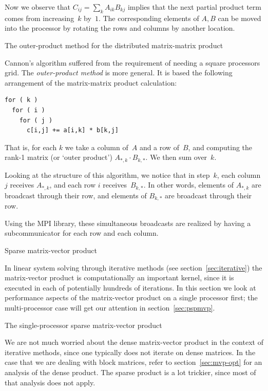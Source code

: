 Now we observe that $C_{ij}=\sum_kA_{ik}B_{kj}$ implies that
the next partial product term comes from increasing~$k$ by~$1$.
The corresponding elements of $A,B$ can be moved into the processor
by rotating the rows and columns by another location.

 {The outer-product method for the distributed matrix-matrix
  product}

Cannon's algorithm suffered from the requirement of needing a square
processors grid.
%
The \emph{outer-product method}%
is more general. It is based the following arrangement of the
matrix-matrix product calculation:
\begin{verbatim}
for ( k ) 
  for ( i )
    for ( j )
      c[i,j] += a[i,k] * b[k,j]
\end{verbatim}
That is, for each $k$ we take a column of~$A$ and a row of~$B$, and computing the
rank-1 matrix (or `outer product') $A_{*,k}\cdot B_{k,*}$. We then sum
over~$k$.

Looking at the structure of this algorithm, we notice that in
step~$k$, each column $j$ receives $A_{*,k}$, and each row $i$
receives~$B_{k,*}$. In other words, elements of $A_{*,k}$ are
broadcast through their row, and elements of $B_{k,*}$ are broadcast
through their row.

Using the MPI library, these simultaneous broadcasts are realized by
having a subcommunicator for each row and each column.


 {Sparse matrix-vector product}
\label{sec:pspmvp}

In linear system solving through iterative methods (see
section~\ref{sec:iterative}) the matrix-vector product is
computationally an important kernel, since it is executed in each of
potentially hundreds of iterations. In this section we look at
performance aspects of the matrix-vector product on a single
processor first; the multi-processor case will get our attention in
section~\ref{sec:pspmvp}.

 {The single-processor sparse matrix-vector product}
\label{sec:spmvp-performance}

We are not much worried about the dense matrix-vector product in the
context of iterative methods, since one typically does not iterate on
dense matrices. In the case that we are dealing with block matrices,
refer to section~\ref{sec:mvp-opt} for an analysis of the dense
product. The sparse product is a lot trickier, since most of that
analysis does not apply.

